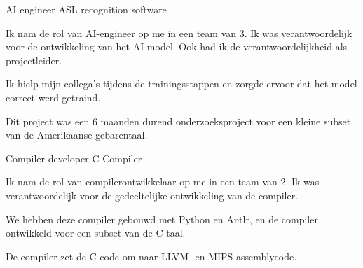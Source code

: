 \begin{cventries}
    \cventry
    {AI engineer} %
    {ASL recognition software} %
    {} 
    {}
    {
      \begin{cvitems} %
        \item {Ik nam de rol van AI-engineer op me in een team van 3. Ik was verantwoordelijk voor de ontwikkeling van het AI-model. Ook had ik de verantwoordelijkheid als projectleider.}
        \item {Ik hielp mijn collega's tijdens de trainingsstappen en zorgde ervoor dat het model correct werd getraind.}
        \item {Dit project was een 6 maanden durend onderzoeksproject voor een kleine subset van de Amerikaanse gebarentaal.}
      \end{cvitems}
    }

    \cventry
    {Compiler developer} %
    {C Compiler} %
    {} 
    {}
    {
      \begin{cvitems} %
        \item {Ik nam de rol van compilerontwikkelaar op me in een team van 2. Ik was verantwoordelijk voor de gedeeltelijke ontwikkeling van de compiler.}
        \item {We hebben deze compiler gebouwd met Python en Antlr, en de compiler ontwikkeld voor een subset van de C-taal.}
        \item {De compiler zet de C-code om naar LLVM- en MIPS-assemblycode.}
      \end{cvitems}
    }

\end{cventries}
